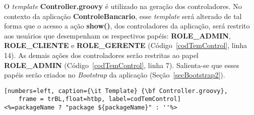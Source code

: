 \vspace{0.2cm}

O   {\it  template}  {\bf   Controller.groovy}  é   utilizado  na   geração  dos
controladores.   No  contexto da  aplicação  {\bf  ControleBancario}, esse  {\it
  template} será  alterado de tal  forma que o  acesso a ação {\bf  show()}, dos
controladores  da  aplicação, será  restrito  aos  usuários  que desempenham  os
respectivos papéis: {\bf ROLE\_ADMIN}, {\bf ROLE\_CLIENTE} e {\bf ROLE\_GERENTE}
(Código~\ref{codTemControl}, linha 14). As  demais ações dos controladores serão
restritas   ao  papel   {\bf  ROLE\_ADMIN}   (Código~\ref{codTemControl},  linha
7). Salienta-se que  esses papéis serão criados no  {\it Bootstrap} da aplicação
(Seção~\ref{secBootstrap2}).

\begin{lstlisting}[numbers=left, caption={\it Template} {\bf Controller.groovy},
    frame = trBL,float=htbp, label=codTemControl] 
<%=packageName ? "package ${packageName}" : ''%>


\end{lstlisting}
